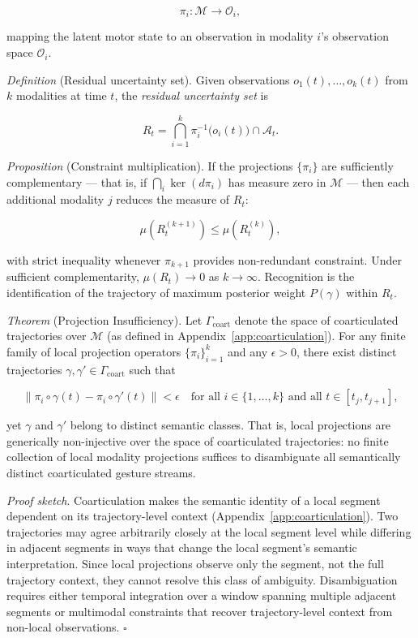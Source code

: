 \documentclass[11pt, a4paper]{article}
\theoremstyle{definition}
\begin{document}
\[
\pi_i : \mathcal{M} \to \mathcal{O}_i,
\]

mapping the latent motor state to an observation in modality $i$'s observation space $\mathcal{O}_i$.

\textit{Definition} (Residual uncertainty set). Given observations $o_1(t), \ldots, o_k(t)$ from $k$ modalities at time $t$, the \emph{residual uncertainty set} is

\[
R_t = \bigcap_{i=1}^{k} \pi_i^{-1}\bigl(o_i(t)\bigr) \cap \mathcal{A}_t.
\]

\textit{Proposition} (Constraint multiplication). If the projections $\{\pi_i\}$ are sufficiently complementary --- that is, if $\bigcap_i \ker(d\pi_i)$ has measure zero in $\mathcal{M}$ --- then each additional modality $j$ reduces the measure of $R_t$:

\[
\mu(R_t^{(k+1)}) \leq \mu(R_t^{(k)}),
\]

with strict inequality whenever $\pi_{k+1}$ provides non-redundant constraint. Under sufficient complementarity, $\mu(R_t) \to 0$ as $k \to \infty$. Recognition is the identification of the trajectory of maximum posterior weight $P(\gamma)$ within $R_t$.

\textit{Theorem} (Projection Insufficiency). Let $\Gamma_{\mathrm{coart}}$ denote the space of coarticulated trajectories over $\mathcal{M}$ (as defined in Appendix~\ref{app:coarticulation}). For any finite family of local projection operators $\{\pi_i\}_{i=1}^k$ and any $\epsilon > 0$, there exist distinct trajectories $\gamma, \gamma' \in \Gamma_{\mathrm{coart}}$ such that

\[
\|\pi_i \circ \gamma(t) - \pi_i \circ \gamma'(t)\| < \epsilon \quad \text{for all } i \in \{1,\ldots,k\} \text{ and all } t \in [t_j, t_{j+1}],
\]

yet $\gamma$ and $\gamma'$ belong to distinct semantic classes. That is, local projections are generically non-injective over the space of coarticulated trajectories: no finite collection of local modality projections suffices to disambiguate all semantically distinct coarticulated gesture streams.

\textit{Proof sketch}. Coarticulation makes the semantic identity of a local segment dependent on its trajectory-level context (Appendix~\ref{app:coarticulation}). Two trajectories may agree arbitrarily closely at the local segment level while differing in adjacent segments in ways that change the local segment's semantic interpretation. Since local projections observe only the segment, not the full trajectory context, they cannot resolve this class of ambiguity. Disambiguation requires either temporal integration over a window spanning multiple adjacent segments or multimodal constraints that recover trajectory-level context from non-local observations. $\square$
\end{document}
